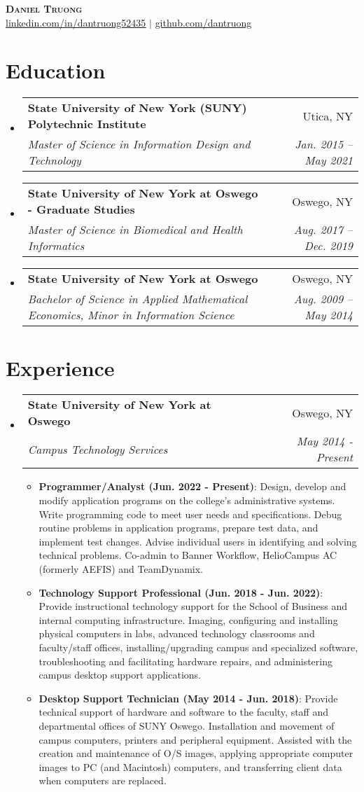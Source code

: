 \documentclass[letterpaper,11pt]{article}
\makeatletter
\newcommand{\resumeItem}[2]{
  \item\small{
    \textbf{#1}{: #2 \vspace{-2pt}}
  }
}
\newcommand{\resumeSubheading}[4]{
  \vspace{-1pt}\item
    \begin{tabular*}{0.97\textwidth}[t]{l@{\extracolsep{\fill}}r}
      \textbf{#1} & #2 \\
      \textit{\small#3} & \textit{\small #4} \\
    \end{tabular*}\vspace{-5pt}
}
\newcommand{\resumeSubHeadingListStart}{\begin{itemize}[leftmargin=*]}
\newcommand{\resumeSubHeadingListEnd}{\end{itemize}}
\newcommand{\resumeItemListStart}{\begin{itemize}}
\newcommand{\resumeItemListEnd}{\end{itemize}\vspace{-5pt}}
\makeatother
\begin{document}

\begin{center}
    \textbf{\Huge \scshape Daniel Truong} \\ \vspace{1pt}
    \href{https://linkedin.com/in/dantruong52435}{\underline{linkedin.com/in/dantruong52435}} $|$
    \href{https://github.com/dantruong}{\underline{github.com/dantruong}}
\end{center}

\section{Education}
  	\resumeSubHeadingListStart
    		\resumeSubheading
      		{State University of New York (SUNY) Polytechnic Institute}{Utica, NY}
      		{Master of Science in Information Design and Technology}{Jan. 2015 -- May  2021}
			\resumeSubheading
      		{State University of New York at Oswego - Graduate Studies}{Oswego, NY}
      		{Master of Science in Biomedical and Health Informatics}{Aug. 2017 -- Dec. 2019}
    		\resumeSubheading
      		{State University of New York at Oswego}{Oswego, NY}
      		{Bachelor of Science in Applied Mathematical Economics, Minor in Information Science}{Aug. 2009 -- May 2014}
  	\resumeSubHeadingListEnd

\section{Experience}
  	\resumeSubHeadingListStart
    	\resumeSubheading
      		{State University of New York at Oswego}{Oswego, NY}
      		{Campus Technology Services}{May 2014 - Present}
      		\resumeItemListStart
				\resumeItem{Programmer/Analyst (Jun. 2022 - Present)}
				{Design, develop and modify application programs on the college's administrative systems. Write programming code to meet user needs and specifications. Debug routine problems in application programs, prepare test data, and implement test changes. Advise individual users in identifying and solving technical problems. Co-admin to Banner Workflow, HelioCampus AC (formerly AEFIS) and TeamDynamix.}
				\resumeItem{Technology Support Professional (Jun. 2018 - Jun. 2022)}
				{Provide instructional technology support for the School of Business and internal computing infrastructure. Imaging, configuring and installing physical computers in labs, advanced technology classrooms and faculty/staff offices, installing/upgrading campus and specialized software,  troubleshooting and facilitating hardware repairs, and administering campus desktop support applications.}
				\resumeItem{Desktop Support Technician (May 2014 - Jun. 2018)}
				{Provide technical support of hardware and software to the faculty, staff and departmental offices of SUNY Oswego. Installation and movement of campus computers, printers and peripheral equipment. Assisted with the creation and maintenance of O/S images, applying appropriate computer images to PC (and Macintosh) computers, and transferring client data when computers are replaced.}
      		\resumeItemListEnd
	\resumeSubHeadingListEnd
\end{document}
